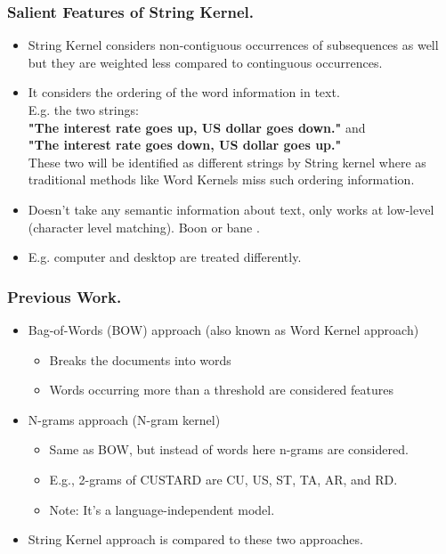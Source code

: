 \documentclass[10pt]{beamer}
\begin{document}
\begin{frame}
	\frametitle{Salient Features of String Kernel.}
	\begin{itemize}
		\item String Kernel considers non-contiguous occurrences of subsequences as well but they are weighted less compared to continguous occurrences.
		\item It considers the ordering of the word information in text.\\
				E.g. the two strings: \\\textbf{"The interest rate goes up, US dollar goes down."} and \textbf{ \\"The interest rate goes down, US dollar goes up."} \\
				These two will be identified as different strings by String kernel where as traditional methods like Word Kernels miss such ordering information.
		\item Doesn't take any semantic information about text, only works at low-level (character level matching). Boon or bane \smiley.
		\item E.g. computer and desktop are treated differently.
	\end{itemize}
\end{frame}

\begin{frame}
   \frametitle{Previous Work.}
	   \begin{itemize}
	      \item Bag-of-Words (BOW) approach (also known as Word Kernel approach)
			\begin{itemize}
				\item Breaks the documents into words
				\item Words occurring more than a threshold are considered features
			\end{itemize}

			\item N-grams approach (N-gram  kernel)
			\begin{itemize}
				\item	Same as BOW, but instead of words here n-grams are considered.
				\item E.g., 2-grams of CUSTARD are CU, US, ST, TA, AR, and RD. 
				\item Note: It's a language-independent model.
			\end{itemize}
			
			\item String Kernel approach is compared to these two approaches.
	   \end{itemize}
\end{frame}
\end{document}
